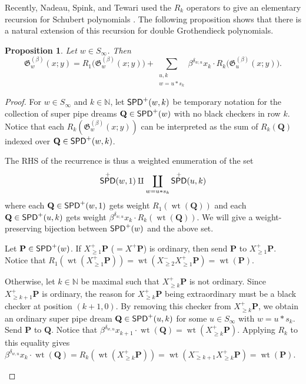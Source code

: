 \documentclass[11pt,reqno]{amsart} %
\makeatletter
\newcommand{\bbN}{\mathbb{N}}
\newcommand{\frakG}{\mathfrak{G}}
\newcommand{\bfP}{\mathbf{P}}
\newcommand{\bfQ}{\mathbf{Q}}
\DeclareMathOperator{\wt}{wt}
\DeclareMathOperator{\SPD}{\sf{SPD}}
\newenvironment{shift}[1][(0,0)]{
    \begin{scope}[shift={#1}]
}{
    \end{scope}
}
\newtheorem{proposition}[theorem]{Proposition}
\theoremstyle{definition}
\newcommand{\drawSquare}[3][black,opacity=0.5]{
    \draw[#1,thin]
    (#2-0.5,#3+0.5) rectangle (#2+0.5,#3-0.5);
}
\newcommand{\drawGraySquare}[3][gray,opacity=0.3]{
    \filldraw[#1,thin]
    (#2-0.5,#3+0.5) rectangle (#2+0.5,#3-0.5);
}
\newcommand{\checkerradius}{0.38}
\newcommand{\drawXChecker}[2]{
    \fill[color=x color 2] (#1,#2) circle (\checkerradius);
    \fill[
        color=x color 1,
        pattern color=x color 1,
        pattern={Lines[distance=2pt]},
        thick
    ] (#1,#2) circle (\checkerradius);
    \draw[color=x color 1,thick] (#1,#2) circle (\checkerradius);
}
\newcommand{\drawYChecker}[2]{
    \fill[color=y color 2] (#1,#2) circle (\checkerradius);
    \fill[
        color=y color 1,
        pattern color=y color 1,
        pattern={Lines[distance=1.5pt,angle=90]},
    ] (#1,#2) circle (\checkerradius);
    \draw[color=y color 1, thick] (#1,#2) circle (\checkerradius);
}
\newcommand{\drawXYChecker}[2]{
    \drawXChecker{#1}{#2}
    \drawYChecker{#1-0.1}{#2+0.1}
}
\newcommand{\drawRCGraphTile}[3]{

    \ifnum #3=0 \fi %
    \ifnum #3=1 \drawXChecker{#1}{#2} \fi
    \ifnum #3=2 \drawYChecker{#1}{#2} \fi
    \ifnum #3=3 \drawXYChecker{#1}{#2} \fi
    \ifnum #3=4 \drawGraySquare{#1}{#2}\drawXChecker{#1}{#2} \fi
    \ifnum #3=5 \drawGraySquare{#1}{#2}\drawYChecker{#1}{#2} \fi
    \ifnum #3=6 \fi
    \ifnum #3=7 \fi
    \ifnum #3=8 \fi
    \ifnum #3=9 \drawGraySquare{#1}{#2} \fi
}
\newcommand{\drawRCGraph}[3]{
    \PD@i = 1
    \PD@j = 1
    \foreach \t in {#3}{
        \drawRCGraphTile{\number\PD@j}{-\number\PD@i}{\t}
        \drawSquare{\number\PD@j}{-\number\PD@i}
        
        \ifnum\PD@j < \numexpr#2\relax
            \global\advance\PD@j by 1
        \else
            \global\PD@j = 1
            \global\advance\PD@i by 1
        \fi
    }
}
\newcommand{\drawNorthLabels}[3]{
    \PD@j = 0
    \foreach \j in {#3}{
        \node at (#2+\PD@j,-#1) {\j};
        \global\advance\PD@j by 1
    }
}
\newcommand{\drawWestLabels}[3]{
    \PD@i = 0
    \foreach \i in {#3}{
        \node at (#2,-#1-\PD@i) {\i};
        \global\advance\PD@i by 1
    }
}
\makeatother
\begin{document}
Recently, Nadeau, Spink, and Tewari used the $R_k$ operators to give an elementary recursion for Schubert polynomials \cite{NadeauSpinkTewari24}.
The following proposition shows that there is a natural extension of this recursion for double Grothendieck polynomials.

\begin{proposition}
\label{prop:R_k Groth recursion}
Let $w\in S_\infty$.
Then \[
    \frakG_w^{(\beta)}(x;y)
    = R_1\big(\frakG_w^{(\beta)}(x;y)\big)
    + \sum_{\substack{
        u,k \\
        w = u*s_k
    }} \beta^{\delta_{w,u}} x_k \cdot R_k\big(\frakG_u^{(\beta)}(x;y)\big).
\]
\end{proposition}

\begin{proof}
For $w\in S_\infty$ and $k\in\bbN$, let $\SPD^+(w,k)$ be temporary notation for the collection of super pipe dreams $\bfQ\in \SPD^+(w)$ with no black checkers in row $k$.
Notice that each $R_k(\frakG_w^{(\beta)}(x;y))$ can be interpreted as the sum of $R_k(\bfQ)$ indexed over $\bfQ\in \SPD^+(w,k)$.

The RHS of the recurrence is thus a weighted enumeration of the set \[
    \SPD^+(w,1)
    \amalg
    \coprod_{w = u*s_k}
    \SPD^+(u,k)
\] where each $\bfQ\in \SPD^+(w,1)$ gets weight $R_1(\wt(\bfQ))$ and each $\bfQ\in \SPD^+(u,k)$ gets weight $\beta^{\delta_{w,u}}x_k\cdot R_k(\wt(\bfQ))$.
We will give a weight-preserving bijection between $\SPD^+(w)$ and the above set.

Let $\bfP\in \SPD^+(w)$.
If $X^+_{\geq 1}\bfP$ ($= X^+\bfP$) is ordinary, then send $\bfP$ to $X^+_{\geq 1}\bfP$.
Notice that $R_1(\wt(X^+_{\geq 1}\bfP)) = \wt(X^-_{\geq 2}X^+_{\geq 1}\bfP) = \wt(\bfP)$.

Otherwise, let $k\in\bbN$ be maximal such that $X^+_{\geq k}\bfP$ is not ordinary.
Since $X^+_{\geq k+1}\bfP$ is ordinary, the reason for $X^+_{\geq k}\bfP$ being extraordinary must be a black checker at position $(k+1,0)$.
By removing this checker from $X^+_{\geq k}\bfP$, we obtain an ordinary super pipe dream $\bfQ\in \SPD^+(u,k)$ for some $u\in S_\infty$ with $w = u*s_k$.
Send $\bfP$ to $\bfQ$.
Notice that $
    \beta^{\delta_{w,u}}x_{k+1}\cdot \wt(\bfQ)
    = \wt(X^+_{\geq k}\bfP)$.
Applying $R_k$ to this equality gives $
    \beta^{\delta_{w,u}}x_k\cdot \wt(\bfQ) 
    = R_k(\wt(X^+_{\geq k}\bfP))
    = \wt(X^-_{\geq k+1}X^+_{\geq k}\bfP)
    = \wt(\bfP)
$.

\begin{figure}
\end{figure}
\end{proof}
\end{document}
